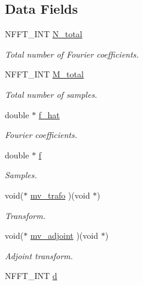 \subsection*{Data Fields}
\begin{DoxyCompactItemize}
\item 
N\-F\-F\-T\-\_\-\-I\-N\-T \hyperlink{structnfst__plan_a80f1cf1229d71acb850bb407f565aafe}{N\-\_\-total}
\begin{DoxyCompactList}\small\item\em Total number of Fourier coefficients. \end{DoxyCompactList}\item 
N\-F\-F\-T\-\_\-\-I\-N\-T \hyperlink{structnfst__plan_a9f8c705a3bc1a03ac8eca2d945d6b32a}{M\-\_\-total}
\begin{DoxyCompactList}\small\item\em Total number of samples. \end{DoxyCompactList}\item 
double $\ast$ \hyperlink{structnfst__plan_a8e7ed6ed137f58dea8f3871d959f8d9c}{f\-\_\-hat}
\begin{DoxyCompactList}\small\item\em Fourier coefficients. \end{DoxyCompactList}\item 
double $\ast$ \hyperlink{structnfst__plan_a314e2d828775d6aa93a26d7c40b7b931}{f}
\begin{DoxyCompactList}\small\item\em Samples. \end{DoxyCompactList}\item 
void($\ast$ \hyperlink{structnfst__plan_a4a3b2ecc26204b3087d1c19b7857943f}{mv\-\_\-trafo} )(void $\ast$)
\begin{DoxyCompactList}\small\item\em Transform. \end{DoxyCompactList}\item 
void($\ast$ \hyperlink{structnfst__plan_aedfe6da9afb5dc0457cc4f2197034fc0}{mv\-\_\-adjoint} )(void $\ast$)
\begin{DoxyCompactList}\small\item\em Adjoint transform. \end{DoxyCompactList}\item 
\hypertarget{structnfst__plan_a42c723954481a7f473e2482fc77952de}{N\-F\-F\-T\-\_\-\-I\-N\-T \hyperlink{structnfst__plan_a42c723954481a7f473e2482fc77952de}{d}}\label{structnfst__plan_a42c723954481a7f473e2482fc77952de}


\end{DoxyCompactItemize}
